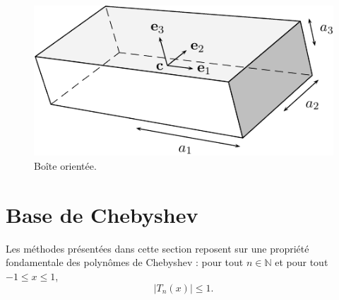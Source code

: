 \begin{figure}
\centering
\includegraphics[scale=1]{figures/obb.pdf}
%
\caption{Boîte orientée.}
\end{figure}

   
\section{Base de Chebyshev}
Les méthodes présentées dans cette section reposent sur une propriété fondamentale des polynômes de Chebyshev : pour tout $n \in \mathbb{N}$ et pour tout $-1 \leq x \leq 1$,
\begin{equation}
	\left| T_n(x) \right| \leq 1.
\end{equation}

